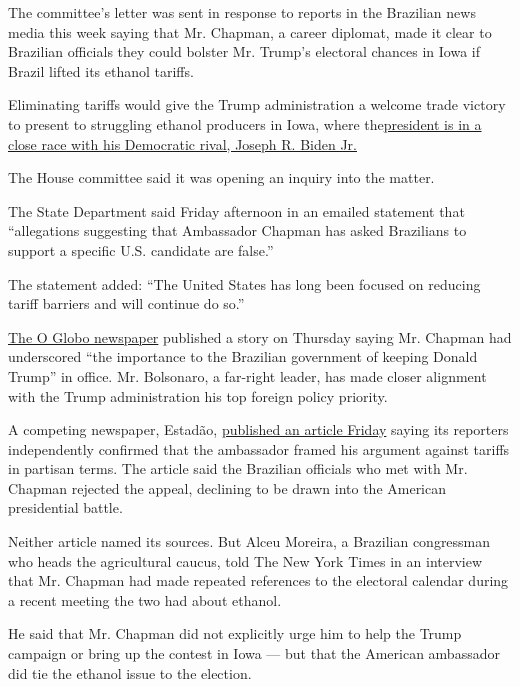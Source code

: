 The committee's letter was sent in response to reports in the Brazilian
news media this week saying that Mr. Chapman, a career diplomat, made it
clear to Brazilian officials they could bolster Mr. Trump's electoral
chances in Iowa if Brazil lifted its ethanol tariffs.

Eliminating tariffs would give the Trump administration a welcome trade
victory to present to struggling ethanol producers in Iowa, where
the\href{https://www.nytimes.com/2020/06/20/us/politics/iowa-polls-trump-biden-ernst-greenfield.html}{president
is in a close race with his Democratic rival, Joseph R. Biden Jr.}

The House committee said it was opening an inquiry into the matter.

The State Department said Friday afternoon in an emailed statement that
``allegations suggesting that Ambassador Chapman has asked Brazilians to
support a specific U.S. candidate are false.''

The statement added: ``The United States has long been focused on
reducing tariff barriers and will continue do so.''

\href{https://blogs.oglobo.globo.com/lauro-jardim/post/embaixador-dos-eua-faz-lobby-no-governo-por-etanol-americano.html}{The
O Globo newspaper} published a story on Thursday saying Mr. Chapman had
underscored ``the importance to the Brazilian government of keeping
Donald Trump'' in office. Mr. Bolsonaro, a far-right leader, has made
closer alignment with the Trump administration his top foreign policy
priority.

A competing newspaper, Estadão,
\href{https://economia.estadao.com.br/noticias/geral,embaixador-dos-eua-pede-isencao-para-etanol-americano-mas-governo-diz-que-nao-tem-cabimento,70003381539}{published
an article Friday} saying its reporters independently confirmed that the
ambassador framed his argument against tariffs in partisan terms. The
article said the Brazilian officials who met with Mr. Chapman rejected
the appeal, declining to be drawn into the American presidential battle.

Neither article named its sources. But Alceu Moreira, a Brazilian
congressman who heads the agricultural caucus, told The New York Times
in an interview that Mr. Chapman had made repeated references to the
electoral calendar during a recent meeting the two had about ethanol.

He said that Mr. Chapman did not explicitly urge him to help the Trump
campaign or bring up the contest in Iowa --- but that the American
ambassador did tie the ethanol issue to the election.

